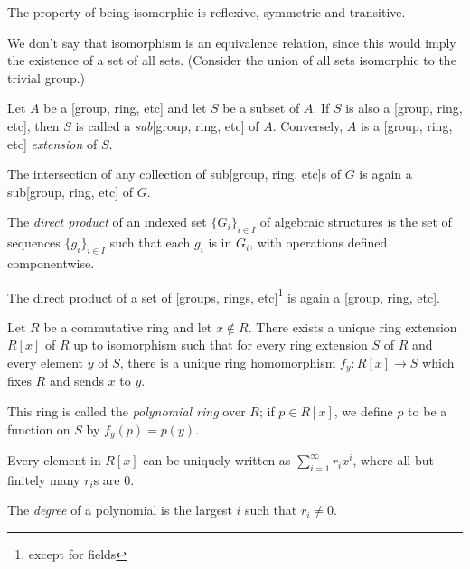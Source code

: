   \begin{prop}
    The property of being isomorphic is reflexive, symmetric and transitive.
  \end{prop}
  \begin{rem}
    We don't say that isomorphism is an equivalence relation, since this would
    imply the existence of a set of all sets. (Consider the union of all
    sets isomorphic to the trivial group.)
  \end{rem}
  \begin{defn}
      Let $A$ be a [group, ring, etc] and let $S$ be a subset of $A$. 
      If $S$ is also a [group, ring, etc], then $S$ is called a \emph{sub}[group,
      ring, etc] of $A$. Conversely, $A$ is a [group, ring, etc]
      \emph{extension} of $S$.
  \end{defn}
  \begin{prop}
      The intersection of any collection of sub[group, ring, etc]s of $G$ is again
      a sub[group, ring, etc] of $G$.
  \end{prop}
\begin{defn}
    The \emph{direct product} of an indexed set $\{G_i\}_{i\in I}$ of algebraic structures is
    the set of sequences $\{g_i\}_{i\in I}$ such that each $g_i$ is in $G_i$, with operations
    defined componentwise.
\end{defn}
\begin{prop}
    The direct product of a set of [groups, rings, etc]\footnote{except for
    fields} is again a [group, ring, etc].
\end{prop}
\begin{prop}
    Let $R$ be a commutative ring and let $x\not\in R$.
    There exists a unique ring extension $R[x]$ of $R$ up to isomorphism such
    that for every ring extension $S$ of $R$ and every element $y$ of $S$,
    there is a unique ring homomorphism $f_y:R[x]\to S$ which fixes $R$ and
    sends $x$ to $y$.
\end{prop}
\begin{defn}
    This ring is called the \emph{polynomial ring} over $R$; if $p\in R[x]$,
    we define $p$ to be a function on $S$ by $f_y(p)=p(y)$.
\end{defn}
\begin{prop}
    Every element in $R[x]$ can be uniquely written as $\sum_{i=1}^\infty r_i
    x^i$, where all but finitely many $r_i$s are $0$.
\end{prop}
\begin{defn}
    The \emph{degree} of a polynomial is the largest $i$ such that $r_i\ne 0$.
\end{defn}
